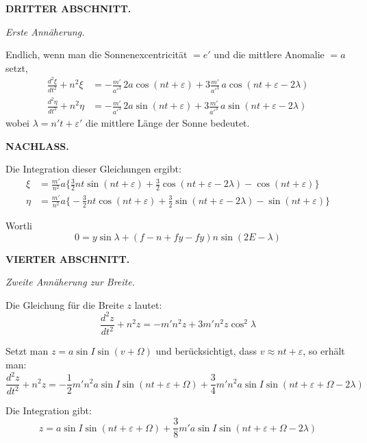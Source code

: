 \documentclass[10pt,a4paper]{article}
\begin{document}
\newpage
\noindent\textbf{DRITTER ABSCHNITT.}

\medskip
\noindent\textit{Erste Ann\"aherung.}

\medskip
\noindent
[5.] Endlich, wenn man die Sonnenexcentricit\"at $= e'$ und die mittlere Anomalie $= a$ setzt,
\begin{align*}
\frac{d^2\xi}{dt^2} + n^2\xi &= -\frac{m'}{a'^3}\,2a\cos(nt + \varepsilon) + 3\frac{m'}{a'^3}\,a\cos(nt + \varepsilon - 2\lambda) \\
\frac{d^2\eta}{dt^2} + n^2\eta &= -\frac{m'}{a'^3}\,2a\sin(nt + \varepsilon) + 3\frac{m'}{a'^3}\,a\sin(nt + \varepsilon - 2\lambda)
\end{align*}
wobei $\lambda = n't + \varepsilon'$ die mittlere L\"ange der Sonne bedeutet.

\newpage
\noindent\textbf{NACHLASS.}

\bigskip
\noindent
[6.] Die Integration dieser Gleichungen ergibt:
\begin{align*}
\xi &= \frac{m'}{n^2}a\biggl\{\frac{3}{2}nt\sin(nt + \varepsilon) + \frac{3}{2}\cos(nt + \varepsilon - 2\lambda) - \cos(nt + \varepsilon)\biggr\} \\
\eta &= \frac{m'}{n^2}a\biggl\{-\frac{3}{2}nt\cos(nt + \varepsilon) + \frac{3}{2}\sin(nt + \varepsilon - 2\lambda) - \sin(nt + \varepsilon)\biggr\}
\end{align*}

Wortli
\begin{equation*}
0 = y\sin\lambda + (f - n + fy - fy)n\sin(2E - \lambda)
\end{equation*}

\bigskip
\noindent\textbf{VIERTER ABSCHNITT.}

\medskip
\noindent\textit{Zweite Ann\"aherung zur Breite.}

\medskip
\noindent
[7.] Die Gleichung f\"ur die Breite $z$ lautet:
\begin{equation*}
\frac{d^2z}{dt^2} + n^2z = -m'n^2z + 3m'n^2z\cos^2\lambda
\end{equation*}

\newpage
\noindent
Setzt man $z = a\sin I\sin(v + \Omega)$ und ber\"ucksichtigt, dass $v \approx nt + \varepsilon$, so erh\"alt man:
\begin{equation*}
\frac{d^2z}{dt^2} + n^2z = -\frac{1}{2}m'n^2a\sin I\sin(nt + \varepsilon + \Omega) + \frac{3}{4}m'n^2a\sin I\sin(nt + \varepsilon + \Omega - 2\lambda)
\end{equation*}

\medskip
\noindent
[8.] Die Integration gibt:
\begin{equation*}
z = a\sin I\sin(nt + \varepsilon + \Omega) + \frac{3}{8}m'a\sin I\sin(nt + \varepsilon + \Omega - 2\lambda)
\end{equation*}
\end{document}

